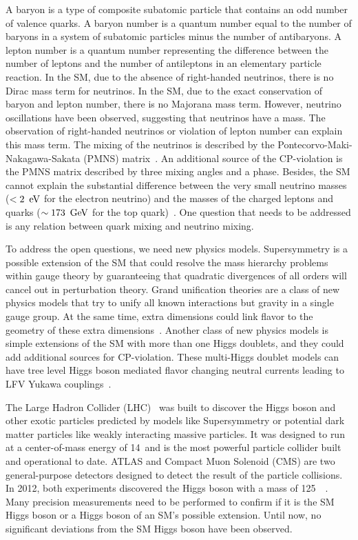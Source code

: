 A baryon is a type of composite subatomic particle that contains an odd number of valence quarks. A baryon number is a quantum number equal to the number of baryons in a system of subatomic particles minus the number of antibaryons. A lepton number is a quantum number representing the difference between the number of leptons and the number of antileptons in an elementary particle reaction.  In the SM, due to the absence of right-handed neutrinos, there is no Dirac mass term for neutrinos. In the SM, due to the exact conservation of baryon and lepton number, there is no Majorana mass term. However, neutrino oscillations have been observed, suggesting that neutrinos have a mass. The observation of right-handed neutrinos or violation of lepton number can explain this mass term. The mixing of the neutrinos is described by the Pontecorvo-Maki-Nakagawa-Sakata (PMNS) matrix~\cite{Tanabashi:2018oca}. An additional source of the CP-violation is the PMNS matrix described by three mixing angles and a phase. Besides, the SM cannot explain the substantial difference between the very small neutrino masses ($< 2~\,\text{e\hspace{-.08em}V}$ for the electron neutrino) and the masses of the charged leptons and quarks ($\sim 173~\,\text{Ge\hspace{-.08em}V}$ for the top quark)~\cite{Tanabashi:2018oca}. One question that needs to be addressed is any relation between quark mixing and neutrino mixing.

To address the open questions, we need new physics models. Supersymmetry is a possible extension of the SM that could resolve the mass hierarchy problems within gauge theory by guaranteeing that quadratic divergences of all orders will cancel out in perturbation theory. Grand unification theories are a class of new physics models that try to unify all known interactions but gravity in a single gauge group. At the same time, extra dimensions could link flavor to the geometry of these extra dimensions~\cite{Raidal:2008jk}. Another class of new physics models is simple extensions of the SM with more than one Higgs doublets, and they could add additional sources for CP-violation. These multi-Higgs doublet models can have tree level Higgs boson mediated flavor changing neutral currents leading to LFV Yukawa couplings~\cite{Raidal:2008jk}.

The Large Hadron Collider (LHC)~\cite{Evans:2008zzb} was built to discover the Higgs boson and other exotic particles predicted by models like Supersymmetry or potential dark matter particles like weakly interacting massive particles. It was designed to run at a center-of-mass energy of 14~\TeV and is the most powerful particle collider built and operational to date. ATLAS and Compact Muon Solenoid (CMS) are two general-purpose detectors designed to detect the result of the particle collisions. In 2012, both experiments discovered the Higgs boson with a mass of 125~\GeV~\cite{Aad:2012tfa, Chatrchyan:2012ufa}. Many precision measurements need to be performed to confirm if it is the SM Higgs boson or a Higgs boson of an SM's possible extension. Until now, no significant deviations from the SM Higgs boson have been observed.

